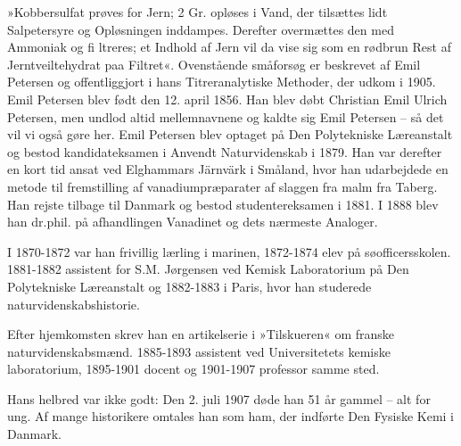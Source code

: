 




»Kobbersulfat prøves for Jern; 2 Gr. opløses i Vand, der tilsættes lidt Salpetersyre og Opløsningen inddampes. Derefter overmættes den med Ammoniak og fi ltreres; et Indhold af Jern vil
da vise sig som en rødbrun Rest af Jerntveiltehydrat paa Filtret«.
Ovenstående småforsøg er beskrevet af Emil Petersen og offentliggjort i hans Titreranalytiske Methoder, der udkom i 1905.
Emil Petersen blev født den 12. april 1856. Han blev døbt
Christian Emil Ulrich Petersen, men undlod altid mellemnavnene og kaldte sig Emil Petersen – så det vil vi også gøre her.
Emil Petersen blev optaget på Den Polytekniske Læreanstalt
og bestod kandidateksamen i Anvendt Naturvidenskab i 1879.
Han var derefter en kort tid ansat ved Elghammars Järnvärk i
Småland, hvor han udarbejdede en metode til fremstilling af
vanadiumpræparater af slaggen fra malm fra Taberg. Han rejste
tilbage til Danmark og bestod studentereksamen i 1881. I 1888
blev han dr.phil. på afhandlingen Vanadinet og dets nærmeste
Analoger.

I 1870-1872 var han frivillig lærling i marinen, 1872-1874
elev på søofficersskolen. 1881-1882 assistent for S.M. Jørgensen
ved Kemisk Laboratorium på Den Polytekniske Læreanstalt og
1882-1883 i Paris, hvor han studerede naturvidenskabshistorie.

Efter hjemkomsten skrev han en artikelserie i »Tilskueren« om
franske naturvidenskabsmænd. 1885-1893 assistent ved Universitetets kemiske laboratorium, 1895-1901 docent og 1901-1907
professor samme sted.

Hans helbred var ikke godt: Den 2. juli 1907 døde han 51 år
gammel – alt for ung. Af mange historikere omtales han som
ham, der indførte Den Fysiske Kemi i Danmark.
